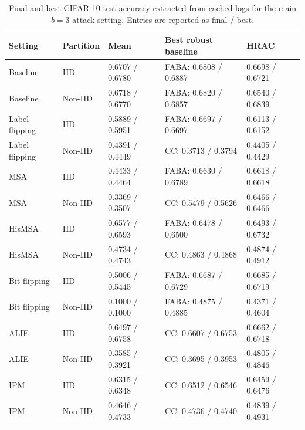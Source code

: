\begin{table}[t]
    \centering
    \scriptsize
    \setlength{\tabcolsep}{3pt}
    \caption{Final and best CIFAR-10 test accuracy extracted from cached logs
    for the main $b=3$ attack setting. Entries are reported as final / best.}
    \label{tab:final-best-accuracy}
    \begin{tabular}{p{}p{}p{}p{}p{}}
        \hline
        \textbf{Setting} & \textbf{Partition} & \textbf{Mean} & \textbf{Best robust baseline} & \textbf{HRAC} \\
        \hline
        Baseline & IID & 0.6707 / 0.6780 & FABA: 0.6808 / 0.6887 & 0.6698 / 0.6721 \\
        Baseline & Non-IID & 0.6718 / 0.6770 & FABA: 0.6820 / 0.6857 & 0.6540 / 0.6839 \\
        Label flipping & IID & 0.5889 / 0.5951 & FABA: 0.6697 / 0.6697 & 0.6113 / 0.6152 \\
        Label flipping & Non-IID & 0.4391 / 0.4449 & CC: 0.3713 / 0.3794 & 0.4405 / 0.4429 \\
        MSA & IID & 0.4433 / 0.4464 & FABA: 0.6630 / 0.6789 & 0.6618 / 0.6618 \\
        MSA & Non-IID & 0.3369 / 0.3507 & CC: 0.5479 / 0.5626 & 0.6466 / 0.6466 \\
        HisMSA & IID & 0.6577 / 0.6593 & FABA: 0.6478 / 0.6500 & 0.6493 / 0.6732 \\
        HisMSA & Non-IID & 0.4734 / 0.4743 & CC: 0.4863 / 0.4868 & 0.4874 / 0.4912 \\
        Bit flipping & IID & 0.5006 / 0.5445 & FABA: 0.6687 / 0.6729 & 0.6685 / 0.6719 \\
        Bit flipping & Non-IID & 0.1000 / 0.1000 & FABA: 0.4875 / 0.4885 & 0.4371 / 0.4604 \\
        ALIE & IID & 0.6497 / 0.6758 & CC: 0.6607 / 0.6753 & 0.6662 / 0.6718 \\
        ALIE & Non-IID & 0.3585 / 0.3921 & CC: 0.3695 / 0.3953 & 0.4805 / 0.4846 \\
        IPM & IID & 0.6315 / 0.6348 & CC: 0.6512 / 0.6546 & 0.6459 / 0.6476 \\
        IPM & Non-IID & 0.4646 / 0.4733 & CC: 0.4736 / 0.4740 & 0.4839 / 0.4931 \\
        \hline
    \end{tabular}
\end{table}

